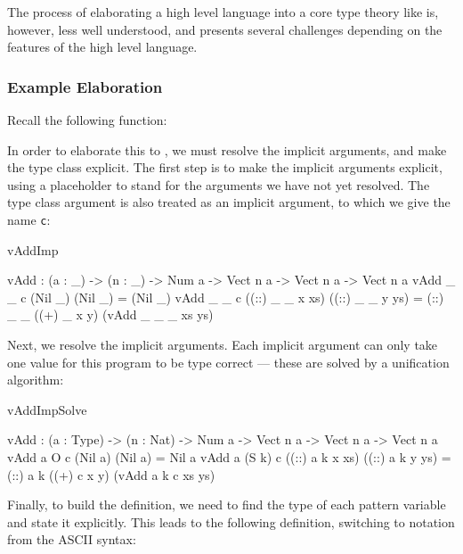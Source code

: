 The process of elaborating a high level language into a core type theory like \TT{} is,
however, less well understood, and presents several challenges depending on the
features of the high level language. 

\subsubsection{Example Elaboration}

Recall the following \Idris{} function:


\noindent
In order to elaborate
this to \TT{}, we must resolve the implicit arguments, and make the type class explicit.
The first step is to make the implicit arguments explicit, using a placeholder
to stand for the arguments we have not yet resolved. The type class argument is
also treated as an implicit argument, to which we give the name \texttt{c}:

\begin{SaveVerbatim}{vAddImp}

vAdd : (a : _) -> (n : _) -> 
       Num a -> Vect n a -> Vect n a -> Vect n a
vAdd _ _ c (Nil _)         (Nil _)         = (Nil _)
vAdd _ _ c ((::) _ _ x xs) ((::) _ _ y ys) 
                = (::) _ _ ((+) _ x y) (vAdd _ _ _ xs ys)

\end{SaveVerbatim}

Next, we resolve the implicit arguments. Each implicit argument can only take
one value for this program to be type correct --- these are solved by a unification
algorithm:

\begin{SaveVerbatim}{vAddImpSolve}

vAdd : (a : Type) -> (n : Nat) -> 
       Num a -> Vect n a -> Vect n a -> Vect n a
vAdd a O     c (Nil a)         (Nil a)         = Nil a
vAdd a (S k) c ((::) a k x xs) ((::) a k y ys) 
                = (::) a k ((+) c x y) (vAdd a k c xs ys)

\end{SaveVerbatim}

Finally, to build the \TT{} definition, we need to find the type of each
pattern variable and state it explicitly. This leads to the following
\TT{} definition, switching to \TT{} notation from the ASCII \Idris{}
syntax:

